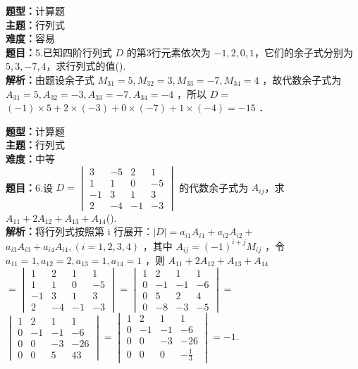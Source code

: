 \documentclass{ctexart}
\newenvironment{question}[5]{%
	\noindent\textbf{题型：}#1\\
	\textbf{主题：}#2\\
	\textbf{难度：}#3\\
	\textbf{题目：}#4\\
	\textbf{解析：}#5\\
	\vspace{1em}
}{}
\begin{document}
	\begin{question}
		{计算题}
		{行列式}
		{容易}
		{5.已知四阶行列式 \(D\) 的第3行元素依次为 \(-1,2,0,1\)，它们的余子式分别为 \(5,3,-7,4\)，求行列式的值(\qquad). }
		{由题设余子式 \(M_{31}=5, M_{32}=3, M_{33}=-7, M_{34}=4\) ，故代数余子式为 \(A_{31}=5, A_{32}=-3, A_{33}=-7, A_{34}=-4\) ，所以 \(D=\) \((-1) \times 5+2 \times(-3)+0 \times(-7)+1 \times(-4)=-15\) ．}
	\end{question}
	
	\begin{question}
		{计算题}
		{行列式}
		{中等}
		{6.设 \(D=\begin{vmatrix}3 & -5 & 2 & 1 \\ 1 & 1 & 0 & -5 \\ -1 & 3 & 1 & 3 \\ 2 & -4 & -1 & -3\end{vmatrix}\) 的代数余子式为 \(A_{ij}\)，求 \(A_{11}+2 A_{12}+A_{13}+A_{14}\)(\qquad). }
		{将行列式按照第 i 行展开：\(|D|=a_{i 1} A_{i 1}+a_{i 2} A_{i 2}+\) \(a_{i 3} A_{i 3}+a_{i 4} A_{i 4},(i=1,2,3,4)\) ，其中 \(A_{i j}=(-1)^{i+j} M_{i j}\) ，令 \(a_{11}=1, a_{12}=2, a_{13}=1, a_{14}=1\) ，则 \(A_{11}+2 A_{12}+A_{13}+A_{14}\) \(=\begin{vmatrix}1 & 2 & 1 & 1 \\ 1 & 1 & 0 & -5 \\ -1 & 3 & 1 & 3 \\ 2 & -4 & -1 & -3\end{vmatrix}=\begin{vmatrix}1 & 2 & 1 & 1 \\ 0 & -1 & -1 & -6 \\ 0 & 5 & 2 & 4 \\ 0 & -8 & -3 & -5\end{vmatrix}=\)
			\(\begin{vmatrix}1 & 2 & 1 & 1 \\ 0 & -1 & -1 & -6 \\ 0 & 0 & -3 & -26 \\ 0 & 0 & 5 & 43\end{vmatrix}=\begin{vmatrix}1 & 2 & 1 & 1 \\ 0 & -1 & -1 & -6 \\ 0 & 0 & -3 & -26 \\ 0 & 0 & 0 & -\frac{1}{3}\end{vmatrix}=-1\).}
	\end{question}
	
\end{document}
